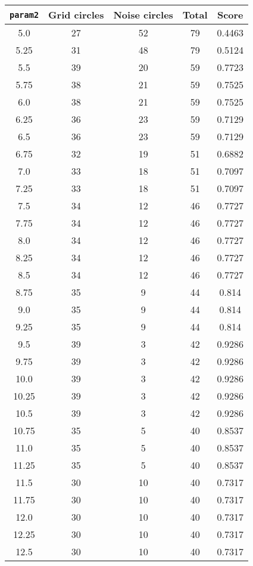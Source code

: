 \documentclass[letterpaper, 12pt]{article}
\begin{document}
\begin{longtable}{|c|c|c|c|c|}
\hline
\textbf{\texttt{param2}} & \textbf{Grid circles} & \textbf{Noise circles} & \textbf{Total} & \textbf{Score} \\
\hline
5.0 & 27 & 52 & 79 & 0.4463 \\
\hline
5.25 & 31 & 48 & 79 & 0.5124 \\
\hline
5.5 & 39 & 20 & 59 & 0.7723 \\
\hline
5.75 & 38 & 21 & 59 & 0.7525 \\
\hline
6.0 & 38 & 21 & 59 & 0.7525 \\
\hline
6.25 & 36 & 23 & 59 & 0.7129 \\
\hline
6.5 & 36 & 23 & 59 & 0.7129 \\
\hline
6.75 & 32 & 19 & 51 & 0.6882 \\
\hline
7.0 & 33 & 18 & 51 & 0.7097 \\
\hline
7.25 & 33 & 18 & 51 & 0.7097 \\
\hline
7.5 & 34 & 12 & 46 & 0.7727 \\
\hline
7.75 & 34 & 12 & 46 & 0.7727 \\
\hline
8.0 & 34 & 12 & 46 & 0.7727 \\
\hline
8.25 & 34 & 12 & 46 & 0.7727 \\
\hline
8.5 & 34 & 12 & 46 & 0.7727 \\
\hline
8.75 & 35 & 9 & 44 & 0.814 \\
\hline
9.0 & 35 & 9 & 44 & 0.814 \\
\hline
9.25 & 35 & 9 & 44 & 0.814 \\
\hline
9.5 & 39 & 3 & 42 & 0.9286 \\
\hline
9.75 & 39 & 3 & 42 & 0.9286 \\
\hline
10.0 & 39 & 3 & 42 & 0.9286 \\
\hline
10.25 & 39 & 3 & 42 & 0.9286 \\
\hline
10.5 & 39 & 3 & 42 & 0.9286 \\
\hline
10.75 & 35 & 5 & 40 & 0.8537 \\
\hline
11.0 & 35 & 5 & 40 & 0.8537 \\
\hline
11.25 & 35 & 5 & 40 & 0.8537 \\
\hline
11.5 & 30 & 10 & 40 & 0.7317 \\
\hline
11.75 & 30 & 10 & 40 & 0.7317 \\
\hline
12.0 & 30 & 10 & 40 & 0.7317 \\
\hline
12.25 & 30 & 10 & 40 & 0.7317 \\
\hline
12.5 & 30 & 10 & 40 & 0.7317 \\

\end{longtable}
\end{document}
